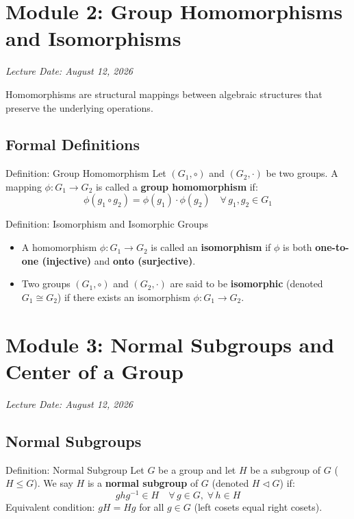 \documentclass[11pt,a4paper]{article}
\begin{document}
\newpage

\section{Module 2: Group Homomorphisms and Isomorphisms}
\textit{Lecture Date: August 12, 2026}

Homomorphisms are structural mappings between algebraic structures that preserve the underlying operations.

\subsection{Formal Definitions}

\begin{defbox}{Definition: Group Homomorphism}
Let $(G_1, \circ)$ and $(G_2, \cdot)$ be two groups. A mapping $\phi: G_1 \to G_2$ is called a \textbf{group homomorphism} if:
\begin{equation}
    \phi(g_1 \circ g_2) = \phi(g_1) \cdot \phi(g_2) \quad \forall\, g_1, g_2 \in G_1
\end{equation}
\end{defbox}

\begin{defbox}{Definition: Isomorphism and Isomorphic Groups}
\begin{itemize}
    \item A homomorphism $\phi: G_1 \to G_2$ is called an \textbf{isomorphism} if $\phi$ is both \textbf{one-to-one (injective)} and \textbf{onto (surjective)}.
    \item Two groups $(G_1, \circ)$ and $(G_2, \cdot)$ are said to be \textbf{isomorphic} (denoted $G_1 \cong G_2$) if there exists an isomorphism $\phi: G_1 \to G_2$.
\end{itemize}
\end{defbox}

\section{Module 3: Normal Subgroups and Center of a Group}
\textit{Lecture Date: August 12, 2026}

\subsection{Normal Subgroups}

\begin{defbox}{Definition: Normal Subgroup}
Let $G$ be a group and let $H$ be a subgroup of $G$ ($H \le G$). We say $H$ is a \textbf{normal subgroup} of $G$ (denoted $H \triangleleft G$) if:
\begin{equation}
    g h g^{-1} \in H \quad \forall\, g \in G, \; \forall\, h \in H
\end{equation}
Equivalent condition: $gH = Hg$ for all $g \in G$ (left cosets equal right cosets).
\end{defbox}
\end{document}
